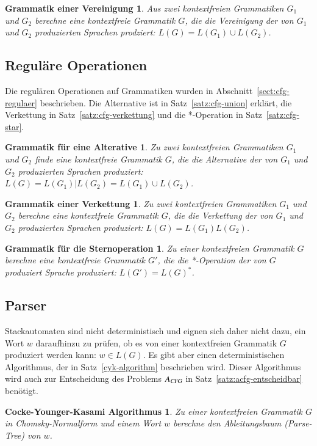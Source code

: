 \newtheorem*{CfgUnion}{Grammatik einer Vereinigung}
\begin{CfgUnion}
Aus zwei kontextfreien Grammatiken $G_1$ und $G_2$ berechne
eine kontextfreie Grammatik $G$, die die
Vereinigung der von $G_1$ und $G_2$ produzierten Sprachen prodziert:
$L(G)=L(G_1)\cup L(G_2)$.
\end{CfgUnion}

\subsection{Reguläre Operationen}
Die regulären Operationen auf Grammatiken wurden in
Abschnitt~\ref{sect:cfg-regulaer} beschrieben.
Die Alternative ist in Satz~\ref{satz:cfg-union} erklärt,
die Verkettung in Satz~\ref{satz:cfg-verkettung} und die *-Operation
in Satz~\ref{satz:cfg-star}.

\newtheorem*{CfgAlternative}{Grammatik für eine Alterative}
\begin{CfgAlternative}
Zu zwei kontextfreien Grammatiken $G_1$ und $G_2$ finde eine
kontextfreie Grammatik $G$, die die
Alternative der von $G_1$ und $G_2$ produzierten Sprachen produziert:
$L(G)=L(G_1)|L(G_2)=L(G_1)\cup L(G_2)$.
\end{CfgAlternative}

\newtheorem*{CfgConcatenation}{Grammatik einer Verkettung}
\begin{CfgConcatenation}
Zu zwei kontextfreien Grammatiken $G_1$ und $G_2$ berechne eine 
kontextfreie Grammatik $G$, die die Verkettung der von $G_1$ und $G_2$
produzierten Sprachen produziert: $L(G)=L(G_1)L(G_2)$.
\end{CfgConcatenation}

\newtheorem*{CfgStar}{Grammatik für die Sternoperation}
\begin{CfgStar}
Zu einer kontextfreien Grammatik $G$ berechne eine kontextfreie Grammatik
$G'$, die die *-Operation der von $G$ produziert Sprache produziert:
$L(G')=L(G)^*$.
\end{CfgStar}

\subsection{Parser}
Stackautomaten sind nicht deterministisch und eignen sich daher nicht
dazu, ein Wort $w$ daraufhinzu zu prüfen, ob es von einer kontextfreien
Grammatik $G$ produziert werden kann: $w\in L(G)$. 
Es gibt aber einen deterministischen Algorithmus, der in
Satz~\ref{cyk-algorithm} beschrieben wird.
Dieser Algorithmus wird auch zur Entscheidung des Problems $A_\textsl{CFG}$
in Satz~\ref{satz:acfg-entscheidbar}
benötigt.

\newtheorem*{CYK}{Cocke-Younger-Kasami Algorithmus}
\begin{CYK}
Zu einer kontextfreien Grammatik $G$ in Chomsky-Nor\-mal\-form und einem
Wort $w$ berechne den Ableitungsbaum (Parse-Tree) von $w$.
\end{CYK}



